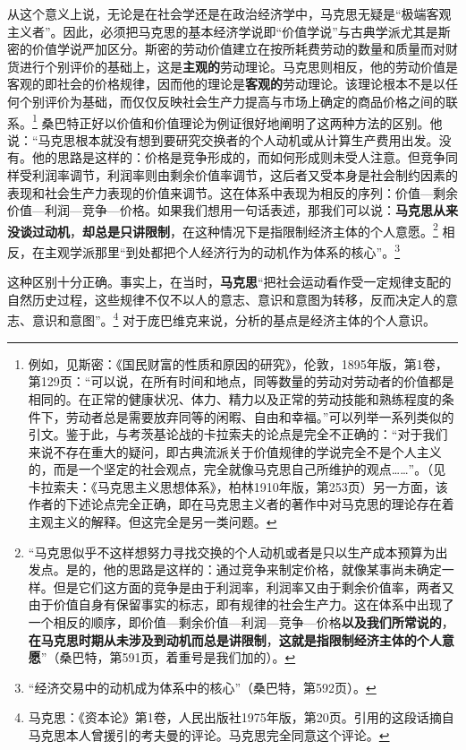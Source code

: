 \documentclass[fontset=fandol, a4paper, 12pt, openright]{ctexbook}
\begin{document}
从这个意义上说，无论是在社会学还是在政治经济学中，马克思无疑是“极端客观主义者”。因此，必须把马克思的基本经济学说即“价值学说”与古典学派尤其是斯密的价值学说严加区分。斯密的劳动价值建立在按所耗费劳动的数量和质量而对财货进行个别评价的基础上，这是\textbf{主观的}劳动理论。马克思则相反，他的劳动价值是客观的即社会的价格规律，因而他的理论是\textbf{客观的}劳动理论。该理论根本不是以任何个别评价为基础，而仅仅反映社会生产力提高与市场上确定的商品价格之间的联系。\footnote{例如，见斯密：《国民财富的性质和原因的研究》，伦敦，1895年版，第1卷，第129页：“可以说，在所有时间和地点，同等数量的劳动对劳动者的价值都是相同的。在正常的健康状况、体力、精力以及正常的劳动技能和熟练程度的条件下，劳动者总是需要放弃同等的闲暇、自由和幸福。”可以列举一系列类似的引文。鉴于此，与考茨基论战的卡拉索夫的论点是完全不正确的：“对于我们来说不存在重大的疑问，即古典流派关于价值规律的学说完全不是个人主义的，而是一个坚定的社会观点，完全就像马克思自己所维护的观点……”。（见卡拉索夫：《马克思主义思想体系》，柏林1910年版，第253页）另一方面，该作者的下述论点完全正确，即在马克思主义者的著作中对马克思的理论存在着主观主义的解释。但这完全是另一类问题。} 桑巴特正好以价值和价值理论为例证很好地阐明了这两种方法的区别。他说：“马克思根本就没有想到要研究交换者的个人动机或从计算生产费用出发。没有。他的思路是这样的：价格是竞争形成的，而如何形成则未受人注意。但竞争同样受利润率调节，利润率则由剩余价值率调节，这后者又受本身是社会制约因素的表现和社会生产力表现的价值来调节。这在体系中表现为相反的序列：价值—剩余价值—利润—竞争—价格。如果我们想用一句话表述，那我们可以说：\textbf{马克思从来没谈过动机}，\textbf{却总是只讲限制}，在这种情况下是指限制经济主体的个人意愿。\footnote{“马克思似乎不这样想努力寻找交换的个人动机或者是只以生产成本预算为出发点。是的，他的思路是这样的：通过竞争来制定价格，就像某事尚未确定一样。但是它们这方面的竞争是由于利润率，利润率又由于剩余价值率，两者又由于价值自身有保留事实的标志，即有规律的社会生产力。这在体系中出现了一个相反的顺序，即价值—剩余价值—利润—竞争—价格\textbf{以及我们所常说的}，\textbf{在马克思时期从未涉及到动机而总是讲限制}，\textbf{这就是指限制经济主体的个人意愿}”（桑巴特，第591页，着重号是我们加的）。} 相反，在主观学派那里“到处都把个人经济行为的动机作为体系的核心”。\footnote{“经济交易中的动机成为体系中的核心”（桑巴特，第592页）。}

这种区别十分正确。事实上，在当时，\textbf{马克思}“把社会运动看作受一定规律支配的自然历史过程，这些规律不仅不以人的意志、意识和意图为转移，反而决定人的意志、意识和意图”。\footnote{马克思：《资本论》第1卷，人民出版社1975年版，第20页。引用的这段话摘自马克思本人曾援引的考夫曼的评论。马克思完全同意这个评论。} 对于庞巴维克来说，分析的基点是经济主体的个人意识。
\end{document}
